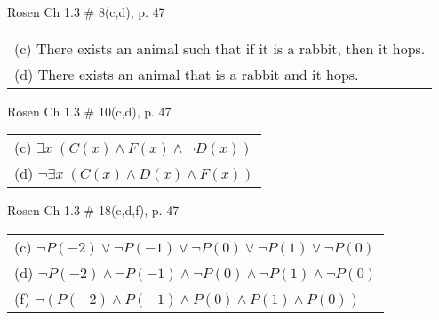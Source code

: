 \documentclass[12pt,addpoints]{exam}
\begin{document}
\begin{questions}
\question Rosen Ch 1.3 \# 8(c,d), p. 47 
	\begin{solution}
     \begin{tabular}{l}
        (c) There exists an animal such that if it is a rabbit, then it hops. \\
        (d) There exists an animal that is a rabbit and it hops. \\
    \end{tabular}
    \end{solution}

\question Rosen Ch 1.3 \# 10(c,d), p. 47 
	\begin{solution}
    \begin{tabular}{l}
    (c) $\exists x\; (C(x) \wedge F(x) \wedge \neg D(x))$ \\
    (d) $\neg \exists x\; (C(x) \wedge D(x) \wedge F(x))$ \\
    \end{tabular}
    \end{solution}

\question Rosen Ch 1.3 \# 18(c,d,f), p. 47 
	\begin{solution}
    \begin{tabular}{l}
    (c) $\neg P(-2) \vee \neg P(-1) \vee \neg P(0) \vee \neg P(1) \vee \neg P(0)$ \\
    (d) $\neg P(-2) \wedge \neg P(-1) \wedge \neg P(0) \wedge \neg P(1) \wedge \neg P(0)$ \\
    (f) $\neg ( P(-2) \wedge P(-1) \wedge P(0) \wedge P(1) \wedge P(0) )$ \\
    \end{tabular}
    \end{solution}

\end{questions}
\end{document}
